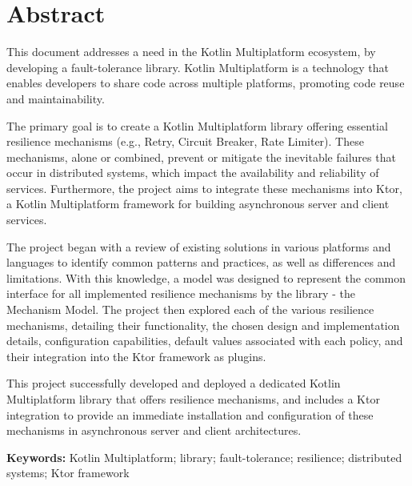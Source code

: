 \chapter*{Abstract}\label{ch:abstract}

This document addresses a need in the Kotlin Multiplatform ecosystem,
by developing a fault-tolerance library.
Kotlin Multiplatform is a technology that enables developers to share code across multiple platforms, promoting code reuse and maintainability.

The primary goal is
to create a Kotlin Multiplatform library
offering essential resilience mechanisms (e.g., Retry, Circuit Breaker, Rate Limiter).
These mechanisms, alone or combined, prevent or mitigate the inevitable failures that occur in distributed systems,
which impact the availability and reliability of services.
Furthermore, the project aims to integrate these mechanisms into Ktor,
a Kotlin Multiplatform framework for building asynchronous server and client services.

The project began with a review of existing solutions in various platforms and languages to identify common patterns and practices, as well as differences and limitations.
With this knowledge,
a model was designed to represent the common interface for all implemented resilience mechanisms by the library - the Mechanism Model.
The project then explored each of the
various resilience mechanisms,
detailing their functionality,
the chosen design and implementation details, configuration capabilities, default values associated with each policy, and their integration into the Ktor framework as plugins.

This project successfully developed
and deployed a dedicated Kotlin Multiplatform library that offers resilience mechanisms,
and includes a Ktor integration to provide an immediate installation and configuration of these mechanisms in asynchronous server and client architectures.

\textbf{Keywords:} Kotlin Multiplatform; library; fault-tolerance; resilience; distributed systems; Ktor framework
